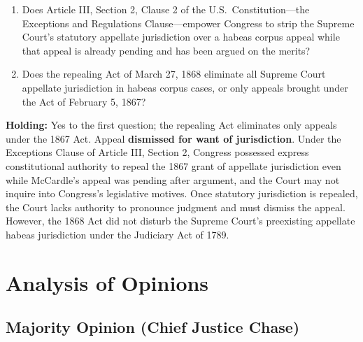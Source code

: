 \documentclass[12pt]{article}
\begin{document}
\begin{enumerate}
  \item Does Article III, Section 2, Clause 2 of the U.S.\ Constitution---the Exceptions and Regulations Clause---empower Congress to strip the Supreme Court's statutory appellate jurisdiction over a habeas corpus appeal while that appeal is already pending and has been argued on the merits?
  \item Does the repealing Act of March 27, 1868 eliminate all Supreme Court appellate jurisdiction in habeas corpus cases, or only appeals brought under the Act of February 5, 1867?
\end{enumerate}

\textbf{Holding:} Yes to the first question; the repealing Act eliminates only appeals under the 1867 Act. Appeal \textbf{dismissed for want of jurisdiction}. Under the Exceptions Clause of Article III, Section 2, Congress possessed express constitutional authority to repeal the 1867 grant of appellate jurisdiction even while McCardle's appeal was pending after argument, and the Court may not inquire into Congress's legislative motives. Once statutory jurisdiction is repealed, the Court lacks authority to pronounce judgment and must dismiss the appeal. However, the 1868 Act did not disturb the Supreme Court's preexisting appellate habeas jurisdiction under the Judiciary Act of 1789.

\section{Analysis of Opinions}
\subsection{Majority Opinion (Chief Justice Chase)}
\end{document}
